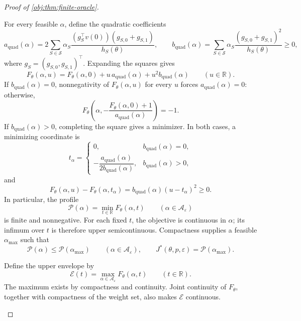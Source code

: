 \documentclass[11pt]{article}
\begin{document}
\begin{proof}[Proof of \cref{obj:thm:finite-oracle}]
\begin{enumerate}
For every feasible \(\alpha\), define the quadratic coefficients
\[
a_{\mathrm{quad}}(\alpha)
=
2\sum_{S\in\mathcal S}
\alpha_S
\frac{(g_S^\top v(0))(g_{S,0}+g_{S,1})}{h_S(\theta)},
\qquad
b_{\mathrm{quad}}(\alpha)
=
\sum_{S\in\mathcal S}
\alpha_S
\frac{(g_{S,0}+g_{S,1})^2}{h_S(\theta)}\ge0,
\]
where \(g_S=(g_{S,0},g_{S,1})^\top\). Expanding the squares gives
\[
F_\theta(\alpha,u)
=
F_\theta(\alpha,0)
+u\,a_{\mathrm{quad}}(\alpha)
+u^2b_{\mathrm{quad}}(\alpha)
\qquad(u\in\mathbb R).
\]
If \(b_{\mathrm{quad}}(\alpha)=0\), nonnegativity of
\(F_\theta(\alpha,u)\) for every \(u\) forces
\(a_{\mathrm{quad}}(\alpha)=0\): otherwise,
\[
F_\theta\!\left(
\alpha,-\frac{F_\theta(\alpha,0)+1}{a_{\mathrm{quad}}(\alpha)}
\right)=-1.
\]
If \(b_{\mathrm{quad}}(\alpha)>0\), completing the square gives a
minimizer. In both cases, a minimizing coordinate is
\[
t_\alpha=
\begin{cases}
0,&b_{\mathrm{quad}}(\alpha)=0,\\[2mm]
-\dfrac{a_{\mathrm{quad}}(\alpha)}
{2b_{\mathrm{quad}}(\alpha)},
&b_{\mathrm{quad}}(\alpha)>0,
\end{cases}
\]
and
\[
F_\theta(\alpha,u)-F_\theta(\alpha,t_\alpha)
=
b_{\mathrm{quad}}(\alpha)(u-t_\alpha)^2\ge0.
\]
In particular, the profile
\[
\mathscr P(\alpha)=\min_{t\in\mathbb R}F_\theta(\alpha,t)
\qquad(\alpha\in\mathcal A_\varepsilon)
\]
is finite and nonnegative. For each fixed \(t\), the objective is
continuous in \(\alpha\); its infimum over \(t\) is therefore upper
semicontinuous. Compactness supplies a feasible
\(\alpha_{\max}\) such that
\[
\mathscr P(\alpha)\le\mathscr P(\alpha_{\max})
\qquad(\alpha\in\mathcal A_\varepsilon),
\qquad
J^*(\theta,p,\varepsilon)=\mathscr P(\alpha_{\max}).
\]

Define the upper envelope by
\[
\mathscr E(t)=
\max_{\alpha\in\mathcal A_\varepsilon}F_\theta(\alpha,t)
\qquad(t\in\mathbb R).
\]
The maximum exists by compactness and continuity. Joint continuity
of \(F_\theta\), together with compactness of the weight set, also
makes \(\mathscr E\) continuous.


\end{enumerate}
\end{proof}
\end{document}
